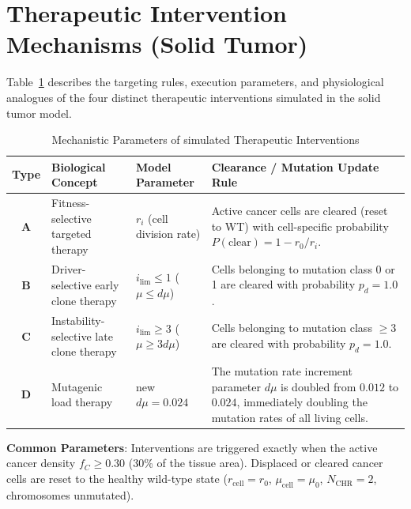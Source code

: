 \documentclass[11pt,a4paper]{article}
\begin{document}
\clearpage

\section{Therapeutic Intervention Mechanisms (Solid Tumor)}
\label{sec:interventions}

Table~\ref{tab:interventions} describes the targeting rules, execution parameters, and physiological analogues of the four distinct therapeutic interventions simulated in the solid tumor model.

\begin{table}[htbp]
\centering
\begin{threeparttable}
\caption{Mechanistic Parameters of simulated Therapeutic Interventions}
\label{tab:interventions}
\begin{tabular}{cp{4.5cm}p{3cm}p{5.5cm}}
\toprule
\textbf{Type} & \textbf{Biological Concept} & \textbf{Model Parameter} & \textbf{Clearance / Mutation Update Rule} \\
\midrule
\textbf{A} & Fitness-selective targeted therapy & $r_i$ (cell division rate) & Active cancer cells are cleared (reset to WT) with cell-specific probability $P(\text{clear}) = 1 - r_0/r_i$. \\
\textbf{B} & Driver-selective early clone therapy & $i_{\lim} \le 1$ ($\mu \le d\mu$) & Cells belonging to mutation class 0 or 1 are cleared with probability $p_d = 1.0$. \\
\textbf{C} & Instability-selective late clone therapy & $i_{\lim} \ge 3$ ($\mu \ge 3 d\mu$) & Cells belonging to mutation class $\ge 3$ are cleared with probability $p_d = 1.0$. \\
\textbf{D} & Mutagenic load therapy & new $d\mu = 0.024$ & The mutation rate increment parameter $d\mu$ is doubled from $0.012$ to $0.024$, immediately doubling the mutation rates of all living cells. \\
\bottomrule
\end{tabular}
\begin{tablenotes}
\small
\item \textbf{Common Parameters}: Interventions are triggered exactly when the active cancer density $f_C \ge 0.30$ (30\% of the tissue area). Displaced or cleared cancer cells are reset to the healthy wild-type state ($r_{\text{cell}} = r_0$, $\mu_{\text{cell}} = \mu_0$, $N_{\text{CHR}} = 2$, chromosomes unmutated).
\end{tablenotes}
\end{threeparttable}
\end{table}
\end{document}
